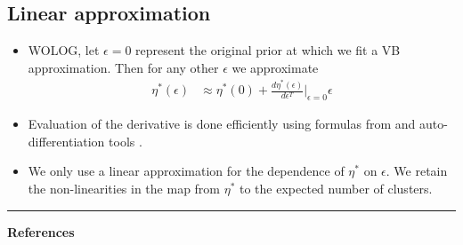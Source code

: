 \documentclass[a0,plainsections,30pt]{sciposter}\usepackage[]{graphicx}\usepackage[]{color}
\newcommand{\Expect}{\mathbb{E}}
\newcommand{\etazopt}{\eta_z^{*}}
\newcommand{\etathetaopt}{\eta_\theta^{*}}
\newcommand{\QExpect}
{\Expect_{q\left(\theta, z \vert \eta_\theta, \etazopt(\eta_\theta)\right)}}
\newcommand{\atzero}{\Big\rvert_{\eta_\theta = \etathetaopt, \epsilon = 0}}
\begin{document}
\begin{minipage}[t]{0.45\textwidth}
\vspace{-0.9in}
\subsection*{Linear approximation}
\vspace{-0.2in}
\begin{itemize}
\item WOLOG, let $\epsilon=0$ represent the original prior at which we fit a VB approximation. Then for any other $\epsilon$ we approximate
\begin{align}
\eta^*(\epsilon)  &\approx  \eta^*(0) + 
\frac{d \eta^*(\epsilon)}{d\epsilon^T}\Big|_{\epsilon=0} \epsilon
\label{eq:linear_approx}
\end{align}

\item Evaluation of the derivative is done efficiently using formulas from \cite{giordano:2017:covariances} and auto-differentiation tools \cite{maclaurin:2015:autograd}.
 
\item We only use a linear approximation for the dependence of $\eta^*$ on $\epsilon$. We retain the non-linearities in the map from $\eta^*$ to the expected number of clusters.


\end{itemize}

\begin{center}
\noindent\rule{0.6\textwidth}{1pt}
\end{center}
{\bf References}
\renewcommand{\section}[2]{}%
\footnotesize{
  
  
}


\end{minipage}
\end{document}
